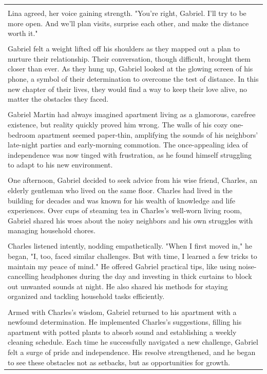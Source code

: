 \begin{small}
\begin{longtable}{p{}}
\\
\\
Lina agreed, her voice gaining strength. "You're right, Gabriel. I'll try to be more open. And we'll plan visits, surprise each other, and make the distance worth it."
\\
\\
Gabriel felt a weight lifted off his shoulders as they mapped out a plan to nurture their relationship. Their conversation, though difficult, brought them closer than ever. As they hung up, Gabriel looked at the glowing screen of his phone, a symbol of their determination to overcome the test of distance. In this new chapter of their lives, they would find a way to keep their love alive, no matter the obstacles they faced.
\\
\\
Gabriel Martin had always imagined apartment living as a glamorous, carefree existence, but reality quickly proved him wrong. The walls of his cozy one-bedroom apartment seemed paper-thin, amplifying the sounds of his neighbors' late-night parties and early-morning commotion. The once-appealing idea of independence was now tinged with frustration, as he found himself struggling to adapt to his new environment.
\\
\\
One afternoon, Gabriel decided to seek advice from his wise friend, Charles, an elderly gentleman who lived on the same floor. Charles had lived in the building for decades and was known for his wealth of knowledge and life experiences. Over cups of steaming tea in Charles's well-worn living room, Gabriel shared his woes about the noisy neighbors and his own struggles with managing household chores.
\\
\\
Charles listened intently, nodding empathetically. "When I first moved in," he began, "I, too, faced similar challenges. But with time, I learned a few tricks to maintain my peace of mind." He offered Gabriel practical tips, like using noise-cancelling headphones during the day and investing in thick curtains to block out unwanted sounds at night. He also shared his methods for staying organized and tackling household tasks efficiently.
\\
\\
Armed with Charles's wisdom, Gabriel returned to his apartment with a newfound determination. He implemented Charles's suggestions, filling his apartment with potted plants to absorb sound and establishing a weekly cleaning schedule. Each time he successfully navigated a new challenge, Gabriel felt a surge of pride and independence. His resolve strengthened, and he began to see these obstacles not as setbacks, but as opportunities for growth.

\end{longtable}
\end{small}
